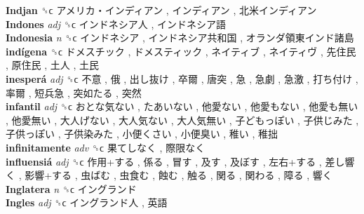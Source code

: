 \textbf{Indjan} ␝ϲ   アメリカ・インディアン ,  インディアン ,  北米インディアン   \\
\textbf{Indones} \emph{adj}  ␝ϲ   インドネシア人 ,  インドネシア語   \\
\textbf{Indonesia} \emph{n}  ␝ϲ   インドネシア ,  インドネシア共和国 ,  オランダ領東インド諸島   \\
\textbf{indígena} ␝ϲ   ドメスチック ,  ドメスティック ,  ネイティブ ,  ネイティヴ ,  先住民 ,  原住民 ,  土人 ,  土民   \\
\textbf{inesperá} \emph{adj}  ␝ϲ   不意 ,  俄 ,  出し抜け ,  卒爾 ,  唐突 ,  急 ,  急劇 ,  急激 ,  打ち付け ,  率爾 ,  短兵急 ,  突如たる ,  突然   \\
\textbf{infantil} \emph{adj}  ␝ϲ   おとな気ない ,  たあいない ,  他愛ない ,  他愛もない ,  他愛も無い ,  他愛無い ,  大人げない ,  大人気ない ,  大人気無い ,  子どもっぽい ,  子供じみた ,  子供っぽい ,  子供染みた ,  小便くさい ,  小便臭い ,  稚い ,  稚拙   \\
\textbf{infinitamente} \emph{adv}  ␝ϲ   果てしなく ,  際限なく   \\
\textbf{influensiá} \emph{adj}  ␝ϲ   作用+する ,  係る ,  冒す ,  及す ,  及ぼす ,  左右+する ,  差し響く ,  影響+する ,  虫ばむ ,  虫食む ,  蝕む ,  触る ,  関る ,  関わる ,  障る ,  響く   \\
\textbf{Inglatera} \emph{n}  ␝ϲ   イングランド   \\
\textbf{Ingles} \emph{adj}  ␝ϲ   イングランド人 ,  英語   \\
